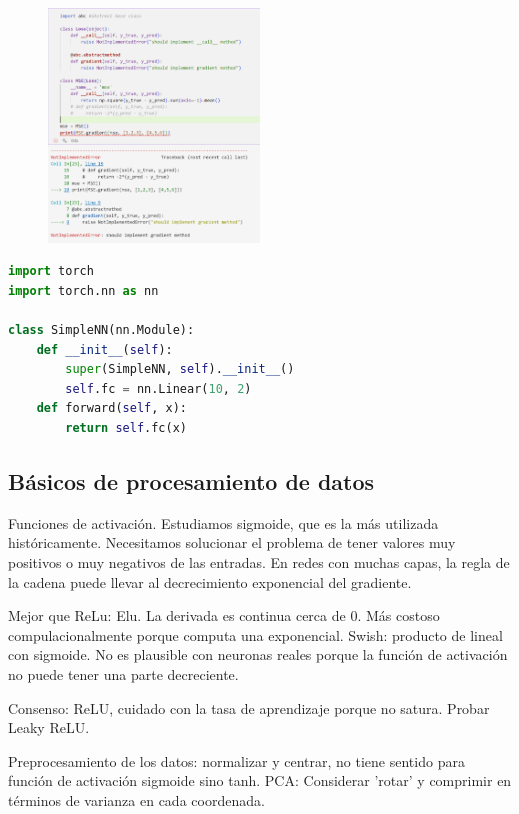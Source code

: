 \documentclass[12pt]{article}
\begin{document}
\begin{figure}
    \centering
    \includegraphics[width=0.5\textwidth]{ejemplo1_abc.png}
\end{figure}

\begin{lstlisting}[language=Python, caption=Simple Neural Network Example]
import torch
import torch.nn as nn

class SimpleNN(nn.Module):
    def __init__(self):
        super(SimpleNN, self).__init__()
        self.fc = nn.Linear(10, 2)
    def forward(self, x):
        return self.fc(x)
\end{lstlisting}

\subsection{Básicos de procesamiento de datos} Funciones de activación. Estudiamos sigmoide, que es la más utilizada históricamente. Necesitamos solucionar el problema de tener valores muy positivos o muy negativos de las entradas. En redes con muchas capas, la regla de la cadena puede llevar al decrecimiento exponencial del gradiente.

Mejor que ReLu: Elu. La derivada es continua cerca de 0. Más costoso compulacionalmente porque computa una exponencial. Swish: producto de lineal con sigmoide. No es plausible con neuronas reales porque la función de activación no puede tener una parte decreciente.


Consenso: ReLU, cuidado con la tasa de aprendizaje porque no satura. Probar Leaky ReLU.


Preprocesamiento de los datos: normalizar y centrar, no tiene sentido para función de activación sigmoide sino tanh. PCA: Considerar 'rotar' y comprimir en términos de varianza en cada coordenada.
\end{document}
